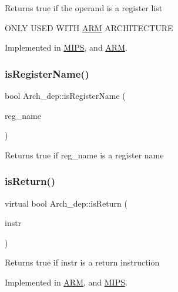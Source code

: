 Returns true if the operand is a register list

O\+N\+LY U\+S\+ED W\+I\+TH \hyperlink{classARM}{A\+RM} A\+R\+C\+H\+I\+T\+E\+C\+T\+U\+RE 

Implemented in \hyperlink{classMIPS_aa1efaf59e1d461388886db68f5e54e06}{M\+I\+PS}, and \hyperlink{classARM_a62f252e1f0782243bc908a080ca1b427}{A\+RM}.

\mbox{\label{classArch__dep_ac12a732622a72990042fc34c96ad0188}} 
\subsubsection{\texorpdfstring{is\+Register\+Name()}{isRegisterName()}}
{\footnotesize\ttfamily bool Arch\+\_\+dep\+::is\+Register\+Name (\begin{DoxyParamCaption}\item[{const string \&}]{reg\+\_\+name }\end{DoxyParamCaption})}

Returns true if reg\+\_\+name is a register name \mbox{\label{classArch__dep_a0f8a68b8dc2188a0578f3b4d92a289ca}} 
\subsubsection{\texorpdfstring{is\+Return()}{isReturn()}}
{\footnotesize\ttfamily virtual bool Arch\+\_\+dep\+::is\+Return (\begin{DoxyParamCaption}\item[{const \hyperlink{classObjdumpInstruction}{Objdump\+Instruction} \&}]{instr }\end{DoxyParamCaption})\hspace{0.3cm}{\ttfamily [pure virtual]}}

Returns true if instr is a return instruction 

Implemented in \hyperlink{classARM_a341bfe78c32b16cd589cc9b4775e38fe}{A\+RM}, and \hyperlink{classMIPS_af2307adac1cb8289cb7510829051f45d}{M\+I\+PS}.

\mbox{\label{classArch__dep_ad56e95263903d54aabbb91efdcf7eba4}} 
